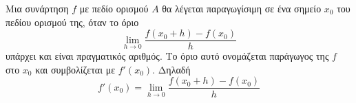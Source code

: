 Μια συνάρτηση $ f $ με πεδίο ορισμού $ A $ θα λέγεται παραγωγίσιμη σε ένα σημείο $ x_0 $ του πεδίου ορισμού της, όταν το όριο
\[ \lim_{h\to 0}\frac{f(x_0+h)-f(x_0)}{h} \]
υπάρχει και είναι πραγματικός αριθμός. Το όριο αυτό ονομάζεται παράγωγος της $ f $ στο $ x_0 $ και συμβολίζεται με $ f'(x_0) $. Δηλαδή
\[ f'(x_0)=\lim_{h\to 0}\frac{f(x_0+h)-f(x_0)}{h} \]
